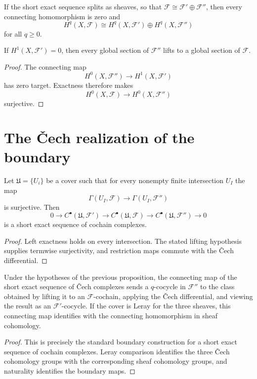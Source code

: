 \begin{corollary}\label{cor:vi48-split}
If the short exact sequence splits as sheaves, so that $\mathcal F\cong\mathcal F'\oplus\mathcal F''$, then every connecting homomorphism is zero and
\[
H^q(X,\mathcal F)\cong H^q(X,\mathcal F')\oplus H^q(X,\mathcal F'')
\]
for all $q\ge0$.
\end{corollary}

\begin{proposition}\label{prop:vi48-h1-vanish-lifts}
If $H^1(X,\mathcal F')=0$, then every global section of $\mathcal F''$ lifts to a global section of $\mathcal F$.
\begin{proof}
The connecting map\[H^0(X,\mathcal F'')\longrightarrow H^1(X,\mathcal F')\]has zero target.  Exactness therefore makes\[H^0(X,\mathcal F)\longrightarrow H^0(X,\mathcal F'')\]surjective.
\end{proof}
\end{proposition}

\section{The \v{C}ech realization of the boundary}
\begin{proposition}\label{prop:vi48-cech-short-exact}
Let $\mathfrak U=\{U_i\}$ be a cover such that for every nonempty finite intersection $U_I$ the map
\[
\Gamma(U_I,\mathcal F)\longrightarrow\Gamma(U_I,\mathcal F'')
\]
is surjective.  Then
\[
0\to C^\bullet(\mathfrak U,\mathcal F')\to C^\bullet(\mathfrak U,\mathcal F)\to C^\bullet(\mathfrak U,\mathcal F'')\to0
\]
is a short exact sequence of cochain complexes.
\begin{proof}
Left exactness holds on every intersection.  The stated lifting hypothesis supplies termwise surjectivity, and restriction maps commute with the \v{C}ech differential.
\end{proof}
\end{proposition}

\begin{theorem}\label{thm:vi48-cech-boundary}
Under the hypotheses of the previous proposition, the connecting map of the short exact sequence of \v{C}ech complexes sends a $q$-cocycle in $\mathcal F''$ to the class obtained by lifting it to an $\mathcal F$-cochain, applying the \v{C}ech differential, and viewing the result as an $\mathcal F'$-cocycle.  If the cover is Leray for the three sheaves, this connecting map identifies with the connecting homomorphism in sheaf cohomology.
\begin{proof}
This is precisely the standard boundary construction for a short exact sequence of cochain complexes.  Leray comparison identifies the three \v{C}ech cohomology groups with the corresponding sheaf cohomology groups, and naturality identifies the boundary maps.
\end{proof}
\end{theorem}

